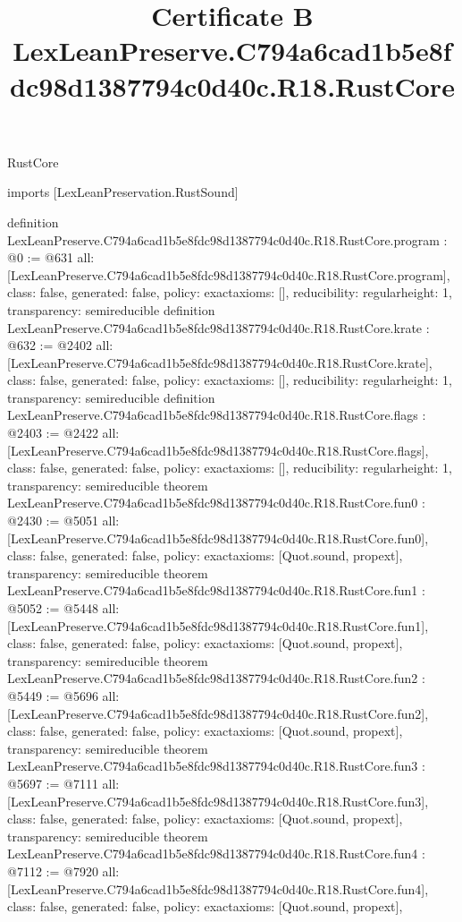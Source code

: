 \begin{lexlean}{RustCore}
\title{Certificate B LexLeanPreserve.C794a6cad1b5e8fdc98d1387794c0d40c.R18.RustCore}
\begin{coremodule}
imports [LexLeanPreservation.RustSound]

definition LexLeanPreserve.C794a6cad1b5e8fdc98d1387794c0d40c.R18.RustCore.program : @0 := @631 {
  all: [LexLeanPreserve.C794a6cad1b5e8fdc98d1387794c0d40c.R18.RustCore.program],
  class: false,
  generated: false,
  policy: exact{axioms: []},
  reducibility: regular{height: 1},
  transparency: semireducible
}
definition LexLeanPreserve.C794a6cad1b5e8fdc98d1387794c0d40c.R18.RustCore.krate : @632 := @2402 {
  all: [LexLeanPreserve.C794a6cad1b5e8fdc98d1387794c0d40c.R18.RustCore.krate],
  class: false,
  generated: false,
  policy: exact{axioms: []},
  reducibility: regular{height: 1},
  transparency: semireducible
}
definition LexLeanPreserve.C794a6cad1b5e8fdc98d1387794c0d40c.R18.RustCore.flags : @2403 := @2422 {
  all: [LexLeanPreserve.C794a6cad1b5e8fdc98d1387794c0d40c.R18.RustCore.flags],
  class: false,
  generated: false,
  policy: exact{axioms: []},
  reducibility: regular{height: 1},
  transparency: semireducible
}
theorem LexLeanPreserve.C794a6cad1b5e8fdc98d1387794c0d40c.R18.RustCore.fun0 : @2430 := @5051 {
  all: [LexLeanPreserve.C794a6cad1b5e8fdc98d1387794c0d40c.R18.RustCore.fun0],
  class: false,
  generated: false,
  policy: exact{axioms: [Quot.sound, propext]},
  transparency: semireducible
}
theorem LexLeanPreserve.C794a6cad1b5e8fdc98d1387794c0d40c.R18.RustCore.fun1 : @5052 := @5448 {
  all: [LexLeanPreserve.C794a6cad1b5e8fdc98d1387794c0d40c.R18.RustCore.fun1],
  class: false,
  generated: false,
  policy: exact{axioms: [Quot.sound, propext]},
  transparency: semireducible
}
theorem LexLeanPreserve.C794a6cad1b5e8fdc98d1387794c0d40c.R18.RustCore.fun2 : @5449 := @5696 {
  all: [LexLeanPreserve.C794a6cad1b5e8fdc98d1387794c0d40c.R18.RustCore.fun2],
  class: false,
  generated: false,
  policy: exact{axioms: [Quot.sound, propext]},
  transparency: semireducible
}
theorem LexLeanPreserve.C794a6cad1b5e8fdc98d1387794c0d40c.R18.RustCore.fun3 : @5697 := @7111 {
  all: [LexLeanPreserve.C794a6cad1b5e8fdc98d1387794c0d40c.R18.RustCore.fun3],
  class: false,
  generated: false,
  policy: exact{axioms: [Quot.sound, propext]},
  transparency: semireducible
}
theorem LexLeanPreserve.C794a6cad1b5e8fdc98d1387794c0d40c.R18.RustCore.fun4 : @7112 := @7920 {
  all: [LexLeanPreserve.C794a6cad1b5e8fdc98d1387794c0d40c.R18.RustCore.fun4],
  class: false,
  generated: false,
  policy: exact{axioms: [Quot.sound, propext]},
}
\end{coremodule}
\end{lexlean}
